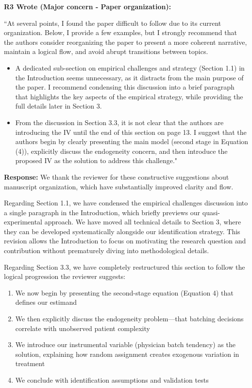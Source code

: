 \documentclass[11pt]{article}
\newenvironment{quote2}
{ \bigskip
\noindent
         \small\em
         \baselineskip=14pt
}
\newcommand{\1}{\hbox{\rm 1\kern-.35em 1}}
\begin{document}
\begin{quote2}
\textbf{R3 Wrote (Major concern -  Paper organization):}  

\noindent``At several points, I found the paper difficult to follow due to its current organization. Below, I provide a few examples, but I strongly recommend that the authors consider reorganizing the paper to present a more coherent narrative, maintain a logical flow, and avoid abrupt transitions between topics.

\begin{itemize}
    \item A dedicated sub-section on empirical challenges and strategy (Section 1.1) in the Introduction seems unnecessary, as it distracts from the main purpose of the paper. I recommend condensing this discussion into a brief paragraph that highlights the key aspects of the empirical strategy, while providing the full details later in Section 3.
    \item From the discussion in Section 3.3, it is not clear that the authors are introducing the IV until the end of this section on page 13. I suggest that the authors begin by clearly presenting the main model (second stage in Equation (4)), explicitly discuss the endogeneity concern, and then introduce the proposed IV as the solution to address this challenge."
\end{itemize}

\end{quote2}

\noindent\textbf{Response:} \color{blue}We thank the reviewer for these constructive suggestions about manuscript organization, which have substantially improved clarity and flow.

Regarding Section 1.1, we have condensed the empirical challenges discussion into a single paragraph in the Introduction, which briefly previews our quasi-experimental approach. We have moved all technical details to Section 3, where they can be developed systematically alongside our identification strategy. This revision allows the Introduction to focus on motivating the research question and contribution without prematurely diving into methodological details.

Regarding Section 3.3, we have completely restructured this section to follow the logical progression the reviewer suggests:
\begin{enumerate}
\item We now begin by presenting the second-stage equation (Equation 4) that defines our estimand
\item We then explicitly discuss the endogeneity problem—that batching decisions correlate with unobserved patient complexity
\item We introduce our instrumental variable (physician batch tendency) as the solution, explaining how random assignment creates exogenous variation in treatment
\item We conclude with identification assumptions and validation tests
\end{enumerate}
\end{document}

